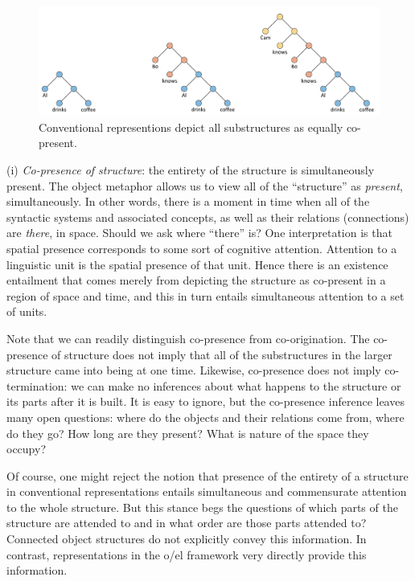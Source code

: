 \begin{figure}
\includegraphics[width=\textwidth]{figures/Tilsen-img110.png}
\caption{Conventional representions depict all substructures as equally co-present.}
\label{fig:5:6}
\end{figure}
 

(i) \textit{Co-presence of structure}: the entirety of the structure is simultaneously present. The object metaphor allows us to view all of the “structure” as \textit{present}, simultaneously. In other words, there is a moment in time when all of the syntactic systems and associated concepts, as well as their relations (connections) are \textit{there}, in space. Should we ask where “there” is? One interpretation is that spatial presence corresponds to some sort of cognitive attention. Attention to a linguistic unit is the spatial presence of that unit. Hence there is an existence entailment that comes merely from depicting the structure as co-present in a region of space and time, and this in turn entails simultaneous attention to a set of units.

  Note that we can readily distinguish co-presence from co-origination. The co-presence of structure does not imply that all of the substructures in the larger structure came into being at one time. Likewise, co-presence does not imply co-termination: we can make no inferences about what happens to the structure or its parts after it is built. It is easy to ignore, but the co-presence inference leaves many open questions: where do the objects and their relations come from, where do they go? How long are they present? What is nature of the space they occupy?
  
  Of course, one might reject the notion that presence of the entirety of a structure in conventional representations entails simultaneous and commensurate attention to the whole structure. But this stance begs the questions of which parts of the structure are attended to and in what order are those parts attended to? Connected object structures do not explicitly convey this information. In contrast, representations in the o/el framework very directly provide this information.

